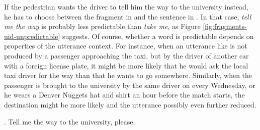 If the pedestrian wants the driver to tell him the way to the university instead, he has to choose between the fragment in \Last[b] and the sentence in \Next. In that case, \textit{tell me the way} is probably less predictable than \textit{take me}, as Figure \ref{fig:fragments-uid-unpredictable} suggests. Of course, whether a word is predictable depends on properties of the utterance context. For instance, when an utterance like \Next is not produced by a passenger approaching the taxi, but by the driver of another car with a foreign license plate, it might be more likely that he would ask the local taxi driver for the way than that he wants to go somewhere. Similarly, when the passenger is brought to the university by the same driver on every Wednesday, or he wears a Denver Nuggets hat and shirt an hour before the match starts, the destination might be more likely and the utterance possibly even further reduced. %

\ex. Tell me the way to the university, please.

